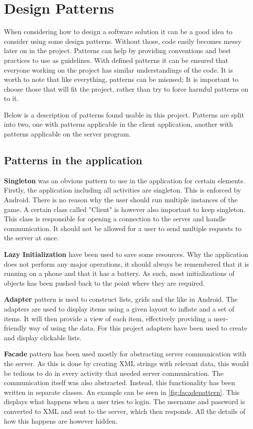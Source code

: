 \section{Design Patterns}
When considering how to design a software solution it can be a good idea to consider using some design patterns. Without those, code easily becomes messy later on in the project. Patterns can help by providing conventions and best practices to use as guidelines. With defined patterns it can be ensured that everyone working on the project has similar understandings of the code. It is worth to note that like everything, patterns can be misused; It is important to choose those that will fit the project, rather than try to force harmful patterns on to it. 

Below is a description of patterns found usable in this project. Patterns are split into two, one with patterns applicable in the client application, another with patterns applicable on the server program.

\subsection{Patterns in the application}
\textbf{Singleton} was an obvious pattern to use in the application for certain elements. Firstly, the application including all activities are singleton. This is enforced by Android. There is no reason why the user should run multiple instances of the game. A certain class called "Client" is however also important to keep singleton. This class is responsible for opening a connection to the server and handle communication. It should not be allowed for a user to send multiple requests to the server at once.

\textbf{Lazy Initialization} have been used to save some resources. Why the application does not perform any major operations, it should always be remembered that it is running on a phone and that it has a battery. As such, most initializations of objects has been pushed back to the point where they are required.

\textbf{Adapter} pattern is used to construct lists, grids and the like in Android. The adapters are used to display items using a given layout to inflate and a set of items. It will then provide a view of each item, effectively providing a user-friendly way of using the data. For this project adapters have been used to create and display clickable lists.

\textbf{Facade} pattern has been used mostly for abstracting server communication with the server. As this is done by creating XML strings with relevant data, this would be tedious to do in every activity that needed server communication. The communication itself was also abstracted. Instead, this functionality has been written in separate classes. An example can be seen in \ref{fig:facadepattern}. This displays what happens when a user tries to login. The username and password is converted to XML and sent to the server, which then responds. All the details of how this happens are however hidden.

